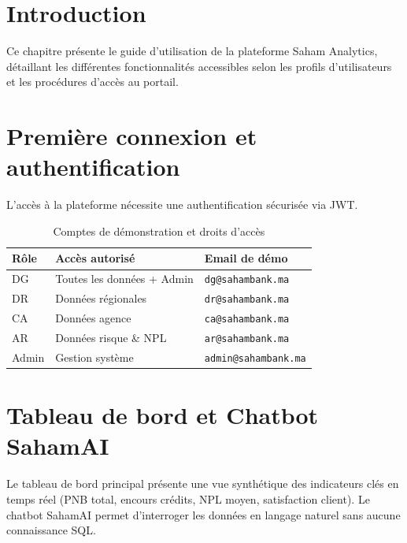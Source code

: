 \documentclass[a4paper,12pt]{report}
\begin{document}
\section*{Introduction}
\begin{doublespace}
Ce chapitre présente le guide d'utilisation de la plateforme Saham Analytics, détaillant les différentes fonctionnalités accessibles selon les profils d'utilisateurs et les procédures d'accès au portail.
\end{doublespace}

\section{Première connexion et authentification}
\begin{doublespace}
L'accès à la plateforme nécessite une authentification sécurisée via JWT.

\begin{table}[H]
\centering
\begin{tabular}{|p{2cm}|p{5.5cm}|p{5.5cm}|}
    \hline
    \textbf{Rôle} & \textbf{Accès autorisé} & \textbf{Email de démo} \\
    \hline
    DG & Toutes les données + Admin & \texttt{dg@sahambank.ma} \\
    \hline
    DR & Données régionales & \texttt{dr@sahambank.ma} \\
    \hline
    CA & Données agence & \texttt{ca@sahambank.ma} \\
    \hline
    AR & Données risque \& NPL & \texttt{ar@sahambank.ma} \\
    \hline
    Admin & Gestion système & \texttt{admin@sahambank.ma} \\
    \hline
\end{tabular}
\caption{Comptes de démonstration et droits d'accès}
\label{tab:demo_accounts}
\end{table}
\end{doublespace}

\section{Tableau de bord et Chatbot SahamAI}
\begin{doublespace}
Le tableau de bord principal présente une vue synthétique des indicateurs clés en temps réel (PNB total, encours crédits, NPL moyen, satisfaction client). Le chatbot SahamAI permet d'interroger les données en langage naturel sans aucune connaissance SQL.
\end{doublespace}
\end{document}
